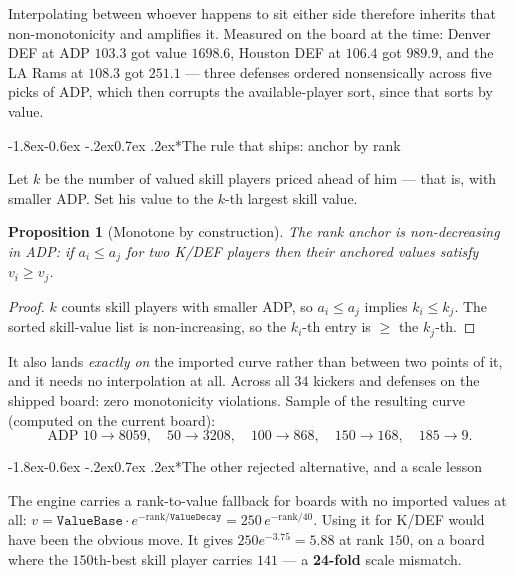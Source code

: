 \documentclass[10pt,a4paper]{article}
\makeatletter
\theoremstyle{plain}
\newtheorem{proposition}[theorem]{Proposition}
\theoremstyle{definition}
\theoremstyle{remark}
\renewcommand\subsubsection{\@startsection{subsubsection}{3}{\z@}%
  {-1.8ex\@plus -0.6ex \@minus -.2ex}{0.7ex \@plus .2ex}{\normalfont\normalsize\bfseries}}
\makeatother
\begin{document}
Interpolating between whoever happens to sit either side therefore inherits that
non-monotonicity and amplifies it. Measured on the board at the time: Denver DEF at ADP
$103.3$ got value $1698.6$, Houston DEF at $106.4$ got $989.9$, and the LA Rams at
$108.3$ got $251.1$ --- three defenses ordered nonsensically across five picks of ADP,
which then corrupts the available-player sort, since that sorts by value.

\subsubsection*{The rule that ships: anchor by rank}

Let $k$ be the number of valued skill players priced ahead of him --- that is, with
smaller ADP. Set his value to the $k$-th largest skill value.

\begin{proposition}[Monotone by construction]
The rank anchor is non-decreasing in ADP: if $a_i \le a_j$ for two K/DEF players then
their anchored values satisfy $v_i \ge v_j$.
\end{proposition}

\begin{proof}
$k$ counts skill players with smaller ADP, so $a_i \le a_j$ implies $k_i \le k_j$. The
sorted skill-value list is non-increasing, so the $k_i$-th entry is $\ge$ the $k_j$-th.
\end{proof}

It also lands \emph{exactly on} the imported curve rather than between two points of it,
and it needs no interpolation at all. Across all $34$ kickers and defenses on the shipped
board: zero monotonicity violations. Sample of the resulting curve (computed on the
current board):
\[
\text{ADP } 10 \to 8059, \quad 50 \to 3208, \quad 100 \to 868, \quad 150 \to 168, \quad 185 \to 9.
\]

\subsubsection*{The other rejected alternative, and a scale lesson}

The engine carries a rank-to-value fallback for boards with no imported values at all:
$v = \texttt{ValueBase}\cdot e^{-\mathrm{rank}/\texttt{ValueDecay}} = 250\,e^{-\mathrm{rank}/40}$.
Using it for K/DEF would have been the obvious move. It gives $250 e^{-3.75} = 5.88$ at
rank $150$, on a board where the $150$th-best skill player carries $141$ --- a
\textbf{24-fold} scale mismatch.
\end{document}
